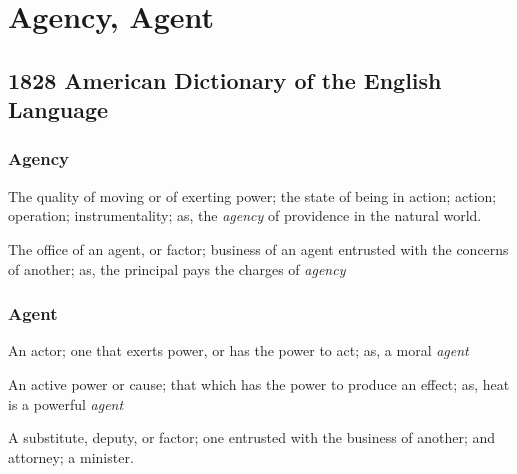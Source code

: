 \section{Agency, Agent}
	\label{AGENCY}
	

\subsection{1828 American Dictionary of the English Language} %
	\label{AGENCY-1828}
	
	\subsubsection{Agency}

		\begin{compactitem}
			\item[1] The quality of moving or of exerting power; the state of being in action; action; operation; instrumentality; as, the \textit{agency} of providence in the natural world.
			\item[2] The office of an agent, or factor; business of an agent entrusted with the concerns of another; as, the principal pays the charges of \textit{agency}
		\end{compactitem}
		
	\subsubsection{Agent}

		\begin{compactitem}
			\item[1] An actor; one that exerts power, or has the power to act; as, a moral \textit{agent}
			\item[2] An active power or cause; that which has the power to produce an effect; as, heat is a powerful \textit{agent}
			\item[3] A substitute, deputy, or factor; one entrusted with the business of another; and attorney; a minister.
		\end{compactitem}

